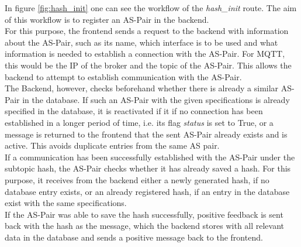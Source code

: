 
In figure \ref{fig:hash_init} one can see the workflow of the \textit{hash\_init} route. The aim of this workflow is to register an AS-Pair in the backend.\\

For this purpose, the frontend sends a request to the backend with information about the AS-Pair, such as its name, which interface is to be used and what information is needed to establish a connection with the AS-Pair. For MQTT, this would be the IP of the broker and the topic of the AS-Pair. This allows the backend to attempt to establish communication with the AS-Pair. \\

The Backend, however, checks beforehand whether there is already a similar AS-Pair in the database. If such an AS-Pair with the given specifications is already specified in the database, it is reactivated if it if no connection has been established in a longer period of time, i.e. its flag \textit{status} is set to True, or a message is returned to the frontend that the sent AS-Pair already exists and is active. This avoids duplicate entries from the same AS pair.\\

If a communication has been successfully established with the AS-Pair under the subtopic hash, the AS-Pair checks whether it has already saved a hash. For this purpose, it receives from the backend either a newly generated hash, if no database entry exists, or an already registered hash, if an entry in the database exist with the same specifications.\\

If the AS-Pair was able to save the hash successfully, positive feedback is sent back with the hash as the message, which the backend stores with all relevant data in the database and sends a positive message back to the frontend.\\

